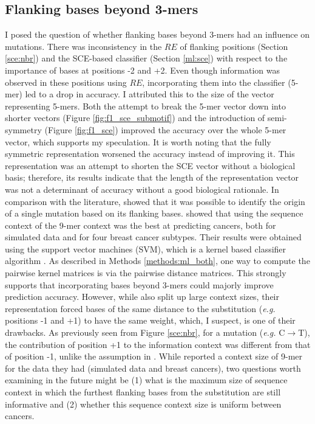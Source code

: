 \subsection{Flanking bases beyond 3-mers}
I posed the question of whether flanking bases beyond 3-mers had an influence on mutations. There was inconsistency in the $RE$ of flanking positions (Section \ref{sce:nbr}) and the SCE-based classifier (Section \ref{ml:sce}) with respect to the importance of bases at positions -2 and +2. Even though information was observed in these positions using $RE$, incorporating them into the classifier (5-mer) led to a drop in accuracy. I attributed this to the size of the vector representing 5-mers. Both the attempt to break the 5-mer vector down into shorter vectors (Figure \ref{fig:f1_sce_submotif}) and the introduction of semi-symmetry (Figure \ref{fig:f1_sce}) improved the accuracy over the whole 5-mer vector, which supports my speculation. It is worth noting that the fully symmetric representation worsened the accuracy instead of improving it. This representation was an attempt to shorten the SCE vector without a biological basis; therefore, its results indicate that the length of the representation vector was not a determinant of accuracy without a good biological rationale. In comparison with the literature, \citet{Zhu2020} showed that it was possible to identify the origin of a single mutation based on its flanking bases. \citep{Zhang2020} showed that using the sequence context of the 9-mer context was the best at predicting cancers, both for simulated data and for four breast cancer subtypes. Their results were obtained using the support vector machines (SVM), which is a kernel based classifier algorithm \citep{Susmita2019AAlgorithms}. As described in Methods \ref{methods:ml_both}, one way to compute the pairwise kernel matrices is via the pairwise distance matrices.  This strongly supports that incorporating bases beyond 3-mers could majorly improve prediction accuracy. However, while \citet{Zhang2020} also split up large context sizes, their representation forced bases of the same distance to the substitution (\textit{e.g.} positions -1 and +1) to have the same weight, which, I suspect, is one of their drawbacks. As previously seen from Figure \ref{sce:nbr}, for a mutation (\textit{e.g.} C$\rightarrow$T), the contribution of position +1 to the information context was different from that of position -1, unlike the assumption in \citet{Zhang2020}. While \citet{Zhang2020} reported a context size of 9-mer for the data they had (simulated data and breast cancers), two questions worth examining in the future might be (1) what is the maximum size of sequence context in which the furthest flanking bases from the substitution are still informative and (2) whether this sequence context size is uniform between cancers. 

